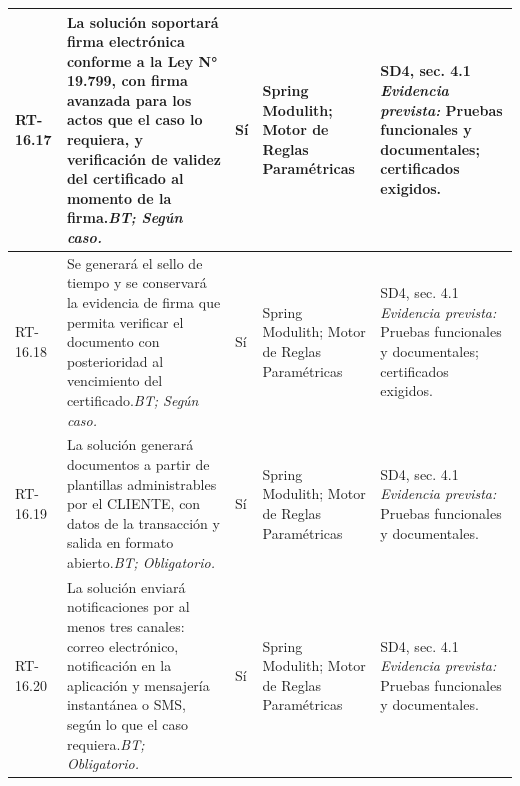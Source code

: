 \begin{paginaHorizontalSynaptix}
\begin{longtable}{|L{0.09\AnchoMatrizTDoce}|L{0.385\AnchoMatrizTDoce}|L{0.065\AnchoMatrizTDoce}|L{0.18\AnchoMatrizTDoce}|L{0.28\AnchoMatrizTDoce}|}
RT-\allowbreak{}16.\allowbreak{}17 &
La solución soportará firma electrónica conforme a la Ley N° 19.799, con firma avanzada para los actos que el caso lo requiera, y verificación de validez del certificado al momento de la firma.\newline\textit{BT; Según caso.} &
Sí &
Spring Modulith; Motor de Reglas Paramétricas &
SD4, sec. 4.1 \newline\textit{Evidencia prevista:} Pruebas funcionales y documentales; certificados exigidos. \\ \hline

RT-\allowbreak{}16.\allowbreak{}18 &
Se generará el sello de tiempo y se conservará la evidencia de firma que permita verificar el documento con posterioridad al vencimiento del certificado.\newline\textit{BT; Según caso.} &
Sí &
Spring Modulith; Motor de Reglas Paramétricas &
SD4, sec. 4.1 \newline\textit{Evidencia prevista:} Pruebas funcionales y documentales; certificados exigidos. \\ \hline

RT-\allowbreak{}16.\allowbreak{}19 &
La solución generará documentos a partir de plantillas administrables por el CLIENTE, con datos de la transacción y salida en formato abierto.\newline\textit{BT; Obligatorio.} &
Sí &
Spring Modulith; Motor de Reglas Paramétricas &
SD4, sec. 4.1 \newline\textit{Evidencia prevista:} Pruebas funcionales y documentales. \\ \hline

RT-\allowbreak{}16.\allowbreak{}20 &
La solución enviará notificaciones por al menos tres canales: correo electrónico, notificación en la aplicación y mensajería instantánea o SMS, según lo que el caso requiera.\newline\textit{BT; Obligatorio.} &
Sí &
Spring Modulith; Motor de Reglas Paramétricas &
SD4, sec. 4.1 \newline\textit{Evidencia prevista:} Pruebas funcionales y documentales. \\ \hline


\end{longtable}
\end{paginaHorizontalSynaptix}
